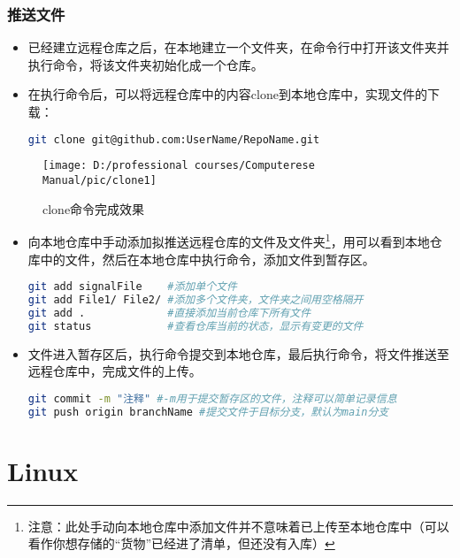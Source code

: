 \documentclass[cn, twoside]{myModel}
\begin{document}
		\subsubsection{推送文件}
			\begin{itemize}[leftmargin=12pt]
				\item[1]
				已经建立远程仓库之后，在本地建立一个文件夹，在命令行中打开该文件夹并执行命令，将该文件夹初始化成一个仓库。
			\end{itemize}
			\begin{itemize}[leftmargin=12pt]
				\item[2]
				在执行命令后，可以将远程仓库中的内容clone到本地仓库中，实现文件的下载：
				\begin{lstlisting}[language=bash, numbers=none]
git clone git@github.com:UserName/RepoName.git
				\end{lstlisting}
			\end{itemize}
			\begin{figure}[H]
				\centering
				\texttt{[image: D:/professional courses/Computerese Manual/pic/clone1]}
				\caption{clone命令完成效果}
				\label{pic5}
			\end{figure}
			\begin{itemize}[leftmargin=12pt]
				\item[3]
				向本地仓库中手动添加拟推送远程仓库的文件及文件夹\footnote[1]{注意：此处手动向本地仓库中添加文件并不意味着已上传至本地仓库中（可以看作你想存储的“货物”已经进了清单，但还没有入库）}，用可以看到本地仓库中的文件，然后在本地仓库中执行命令，添加文件到暂存区。
				\begin{lstlisting}[language=bash, numbers=none]
git add signalFile    #添加单个文件
git add File1/ File2/ #添加多个文件夹，文件夹之间用空格隔开
git add .             #直接添加当前仓库下所有文件
git status            #查看仓库当前的状态，显示有变更的文件
				\end{lstlisting}
			\end{itemize}
			\begin{itemize}[leftmargin=12pt]
				\item[4]
				文件进入暂存区后，执行命令提交到本地仓库，最后执行命令，将文件推送至远程仓库中，完成文件的上传。
				\begin{lstlisting}[language=bash, numbers=none]
git commit -m "注释" #-m用于提交暂存区的文件，注释可以简单记录信息
git push origin branchName #提交文件于目标分支，默认为main分支
				\end{lstlisting}
			\end{itemize}
\clearpage
	\section{Linux}
\end{document}
